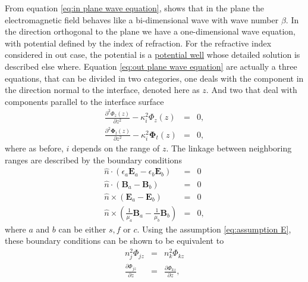 \documentclass[12pt,twoside,english]{book}
\renewcommand{\~}{\perispomeni}%
\numberwithin{equation}{section}
\numberwithin{figure}{section}
\begin{document}
From equation \ref{eq:in plane wave equation}, shows that in the plane the electromagnetic field behaves like a bi-dimensional wave with wave number $\beta$. In the direction orthogonal to the plane we have a one-dimensional wave equation, with potential defined by the index of refraction. For the refractive index considered in out case, the potential is a \href{http://en.wikipedia.org/wiki/Finite_potential_well}{potential well} whose detailed solution is described else where. Equation \ref{eq:out plane wave equation} are actually a three equations, that can be divided in two categories, one deals with the component in the direction normal to the interface, denoted here as $z$. And two that deal with components parallel to the interface surface
\begin{subequations}\begin{eqnarray}
\frac{\partial^{2}\Phi_{z}\left(z\right)}{\partial z^{2}}-\kappa_i^{2}\Phi_{z}\left(z\right) & = & 0,\label{eq:wave equation zz}\\
\frac{\partial^{2}\mathbf{\Phi}_{t}\left(z\right)}{\partial z^{2}}-\kappa_i^{2}\mathbf{\Phi}_{t}\left(z\right) & = & 0,\label{eq:wave equation zt}
\end{eqnarray}\end{subequations}
where as before, $i$ depends on the range of $z$. The linkage between neighboring ranges are described by the boundary conditions
\begin{subequations}
\begin{eqnarray}
\hat{n}\cdot\left(\epsilon_{a}\mathbf{E}_{a}-\epsilon_{b}\mathbf{E}_{b}\right) & = & 0\label{eq:boundary conditions 1}\\
\hat{n}\cdot\left(\mathbf{B}_{a}-\mathbf{B}_{b}\right) & = & 0\label{eq:boundary conditions 2}\\
\hat{n}\times\left(\mathbf{E}_{a}-\mathbf{E}_{b}\right) & = & 0\label{eq:boundary conditions 3}\\
\hat{n}\times\left(\frac{1}{\mu_{a}}\mathbf{B}_{a}-\frac{1}{\mu_{b}}\mathbf{B}_{b}\right) & = & 0,\label{eq:boundary conditions 4}\end{eqnarray}
\label{eq:boundary conditions}\end{subequations}
where $a$ and $b$ can be either $s,f$ or $c$. Using the assumption \ref{eq:assumption E}, these boundary conditions can be shown to be equivalent to
\begin{subequations}\begin{eqnarray}
n_{j}^{2}\Phi_{jz} & = & n_{k}^{2}\Phi_{kz}\label{eq:boundary Ez}\\
\frac{\partial\Phi_{jz}}{\partial z} & = & \frac{\partial\Phi_{kz}}{\partial z},
\label{eq:boundary dEz}\end{eqnarray}
\label{eq:boundary E}\end{subequations}
\end{document}
